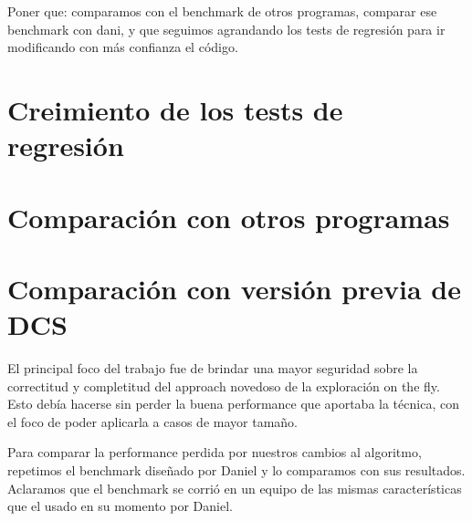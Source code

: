 Poner que: comparamos con el benchmark de otros programas, comparar ese benchmark con dani, y que seguimos agrandando los tests de regresión para ir modificando con más confianza el código.

\section{Creimiento de los tests de regresión}


\section{Comparación con otros programas}


\section{Comparación con versión previa de DCS}
El principal foco del trabajo fue de brindar una mayor seguridad sobre la correctitud y completitud del approach novedoso de la exploración on the fly. Esto debía hacerse sin perder la buena performance que aportaba la técnica, con el foco de poder aplicarla a casos de mayor tamaño.

Para comparar la performance perdida por nuestros cambios al algoritmo, repetimos el benchmark diseñado por Daniel y lo comparamos con sus resultados. Aclaramos que el benchmark se corrió en un equipo de las mismas características que el usado en su momento por Daniel.

